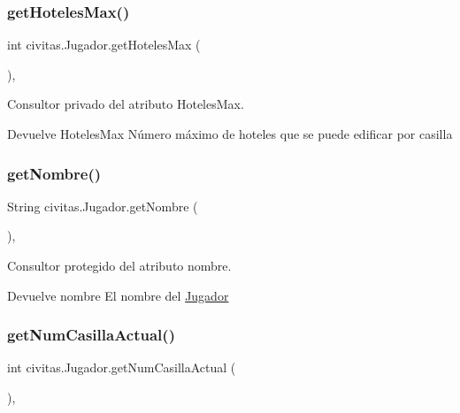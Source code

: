 \subsubsection{\texorpdfstring{get\+Hoteles\+Max()}{getHotelesMax()}}
{\footnotesize\ttfamily int civitas.\+Jugador.\+get\+Hoteles\+Max (\begin{DoxyParamCaption}{ }\end{DoxyParamCaption})\hspace{0.3cm}{\ttfamily [inline]}, {\ttfamily [private]}}

Consultor privado del atributo Hoteles\+Max. \begin{DoxyReturn}{Devuelve}
Hoteles\+Max Número máximo de hoteles que se puede edificar por casilla 
\end{DoxyReturn}
\mbox{\label{classcivitas_1_1Jugador_a798c1fffaaf1dd8d12f36dd3d09b4f1b}} 
\subsubsection{\texorpdfstring{get\+Nombre()}{getNombre()}}
{\footnotesize\ttfamily String civitas.\+Jugador.\+get\+Nombre (\begin{DoxyParamCaption}{ }\end{DoxyParamCaption})\hspace{0.3cm}{\ttfamily [inline]}, {\ttfamily [protected]}}

Consultor protegido del atributo nombre. \begin{DoxyReturn}{Devuelve}
nombre El nombre del \hyperlink{classcivitas_1_1Jugador}{Jugador} 
\end{DoxyReturn}
\mbox{\label{classcivitas_1_1Jugador_ae60e7e2b72553535a3100e11a89e6948}} 
\subsubsection{\texorpdfstring{get\+Num\+Casilla\+Actual()}{getNumCasillaActual()}}
{\footnotesize\ttfamily int civitas.\+Jugador.\+get\+Num\+Casilla\+Actual (\begin{DoxyParamCaption}{ }\end{DoxyParamCaption})\hspace{0.3cm}{\ttfamily [inline]}, {\ttfamily [package]}}

